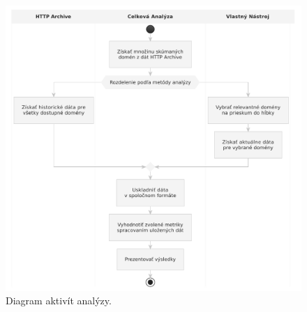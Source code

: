 \begin{figure}[!htb]
\begin{center}
 \includegraphics[scale=0.76]{obrazky-figures/analysis-activity-diagram-final.pdf}    
 \caption{Diagram aktivít analýzy.}
 \label{img:analysis-activity-diagram}
\end{center}
\end{figure}
